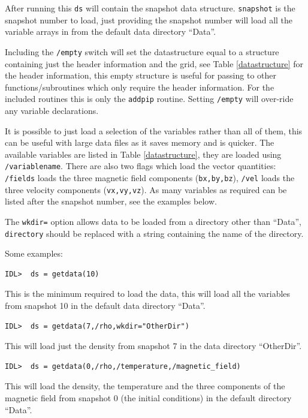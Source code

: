 \documentclass[11pt]{article}
\begin{document}
After running this \texttt{ds} will contain the snapshot data structure. \texttt{snapshot} is the snapshot number to load, just providing the snapshot number will load all the variable arrays in from the default data directory ``Data''.

Including the \texttt{/empty} switch will set the datastructure equal to a structure containing just the header information and the grid, see Table \ref{datastructure} for the header information, this empty structure is useful for passing to other functions/subroutines which only require the header information. For the included routines this is only the \texttt{addpip} routine. Setting \texttt{/empty} will over-ride any variable declarations.

It is possible to just load a selection of the variables rather than all of them, this can be useful with large data files as it saves memory and is quicker. The available variables are listed in Table \ref{datastructure}, they are loaded using \texttt{/variablename}. There are also two flags which load the vector quantities: \texttt{/fields} loads the three magnetic field components (\texttt{bx,by,bz}), \texttt{/vel} loads the three velocity components (\texttt{vx,vy,vz}). As many variables as required can be listed after the snapshot number, see the examples below.

The \texttt{wkdir=} option allows data to be loaded from a directory other than ``Data'', \texttt{directory} should be replaced with a string containing the name of the directory.

Some examples:
\begin{verbatim}
IDL>  ds = getdata(10)
\end{verbatim}
This is the minimum required to load the data, this will load all the variables from snapshot 10 in the default data directory ``Data''.

\begin{verbatim}
IDL>  ds = getdata(7,/rho,wkdir="OtherDir")
\end{verbatim}
This will load just the density from snapshot 7 in the data directory ``OtherDir''.

\begin{verbatim}
IDL>  ds = getdata(0,/rho,/temperature,/magnetic_field)
\end{verbatim}
This will load the density, the temperature and the three components of the magnetic field from snapshot 0 (the initial conditions) in the default directory ``Data''.
\end{document}

